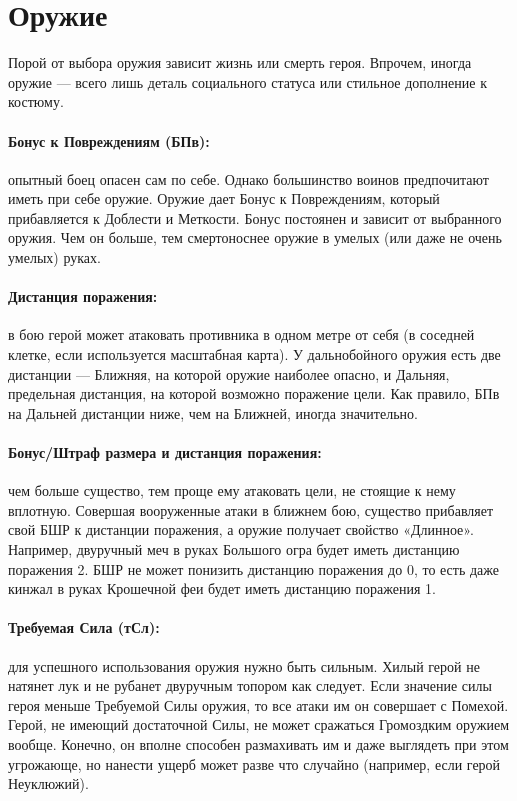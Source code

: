 \section{Оружие}
Порой от выбора оружия зависит жизнь или смерть героя. Впрочем, иногда оружие — всего лишь деталь социального статуса или стильное дополнение к костюму.
\paragraph{Бонус к Повреждениям (БПв):} опытный боец опасен сам по себе. Однако большинство воинов предпочитают иметь при себе оружие. Оружие дает Бонус к Повреждениям, который прибавляется к Доблести и Меткости. Бонус постоянен и зависит от выбранного оружия. Чем он больше, тем смертоноснее оружие в умелых (или даже не очень умелых) руках.
\paragraph{Дистанция поражения:} в бою герой может атаковать противника в одном метре от себя (в соседней клетке, если используется масштабная карта). У дальнобойного оружия есть две дистанции — Ближняя, на которой оружие наиболее опасно, и Дальняя, предельная дистанция, на которой возможно поражение цели. Как правило, БПв на Дальней дистанции ниже, чем на Ближней, иногда значительно.
\paragraph{Бонус/Штраф размера и дистанция поражения:} чем больше существо, тем проще ему атаковать цели, не стоящие к нему вплотную. Совершая вооруженные атаки в ближнем бою, существо прибавляет свой БШР к дистанции поражения, а оружие получает свойство «Длинное». Например, двуручный меч в руках Большого огра будет иметь дистанцию поражения 2. БШР не может понизить дистанцию поражения до 0, то есть даже кинжал в руках Крошечной феи будет иметь дистанцию поражения 1.
\paragraph{Требуемая Сила (тСл):} для успешного использования оружия нужно быть сильным. Хилый герой не натянет лук и не рубанет двуручным топором как следует. 
\newline
Если значение силы героя меньше Требуемой Силы оружия, то все атаки им он совершает с Помехой. Герой, не имеющий достаточной Силы, не может сражаться Громоздким оружием вообще. Конечно, он вполне способен размахивать им и даже выглядеть при этом угрожающе, но нанести ущерб может разве что случайно (например, если герой Неуклюжий).
